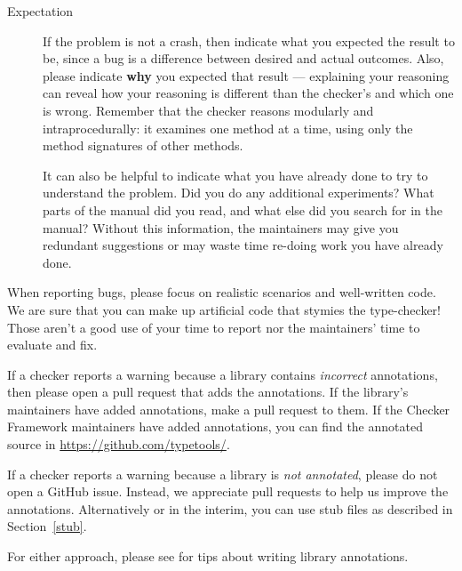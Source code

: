 \begin{description}
\item[Expectation]
  If the problem is not a crash, then
  indicate what you expected the result to be, since a bug is a difference
  between desired and actual outcomes.  Also, please indicate \textbf{why}
  you expected that result --- explaining your reasoning can reveal
  how your reasoning is different than the checker's and which
  one is wrong.  Remember that the checker reasons modularly and
  intraprocedurally:  it examines one method at a time, using only the
  method signatures of other methods.

  It can also be helpful to indicate what you have already done to try to
  understand the problem.  Did you do any additional experiments?  What
  parts of the manual did you read, and what else did you search for in the
  manual?  Without this information, the maintainers may give you redundant
  suggestions or may waste time re-doing work you have already done.
\end{description}


When reporting bugs, please focus on realistic scenarios and well-written
code.  We are sure that you can make up artificial code that stymies the
type-checker!  Those aren't a good use of your time to report nor the
maintainers' time to evaluate and fix.



If a checker reports a warning because a library contains \emph{incorrect} annotations,
then please open a pull request that adds the annotations.  If the
library's maintainers have added annotations, make a pull request to them.
If the Checker Framework maintainers have added annotations,
you can find the annotated source in \url{https://github.com/typetools/}.

If a checker reports a warning because a library is \emph{not
annotated}, please do not open a GitHub issue.
Instead, we appreciate pull requests to help us improve the annotations.
Alternatively or in the interim, you can use stub files as described in
Section~\ref{stub}.

For either approach, please see  for
tips about writing library annotations.

